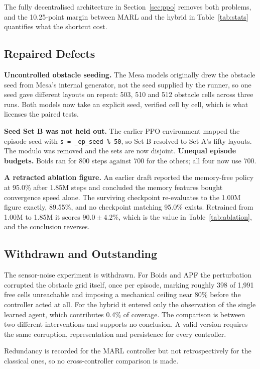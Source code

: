 \documentclass[a4paper, 10pt, conference]{ieeeconf}
\begin{document}
The fully decentralised architecture in Section~\ref{sec:ppo}
removes both problems, and the 10.25-point margin between MARL and the
hybrid in Table~\ref{tab:stats} quantifies what the shortcut cost.

\subsection{Repaired Defects}

\textbf{Uncontrolled obstacle seeding.} The Mesa models originally
drew the obstacle seed from Mesa's internal generator, not the seed
supplied by the runner, so one seed gave different layouts on repeat:
503, 510 and 512 obstacle cells across three runs. Both models now
take an explicit seed, verified cell by cell, which is what licenses
the paired tests.

\textbf{Seed Set B was not held out.} The earlier PPO environment
mapped the episode seed with \texttt{s = \_ep\_seed \% 50}, so Set B
resolved to Set A's fifty layouts. The modulo was removed and the sets
are now disjoint. \textbf{Unequal episode budgets.} Boids ran
for 800 steps against 700 for the others; all four now use 700.

\textbf{A retracted ablation figure.} An earlier draft reported the
memory-free policy at 95.0\% after 1.85M steps and concluded the
memory features bought convergence speed alone. The surviving
checkpoint re-evaluates to the 1.00M figure exactly, 89.55\%, and no
checkpoint matching 95.0\% exists. Retrained from 1.00M to 1.85M it
scores $90.0\pm4.2\%$, which is the value in
Table~\ref{tab:ablation}, and the conclusion reverses.

\subsection{Withdrawn and Outstanding}

The sensor-noise experiment is withdrawn. For Boids and APF the
perturbation corrupted the obstacle grid itself, once per episode,
marking roughly 398 of 1{,}991 free cells unreachable and imposing a
mechanical ceiling near 80\% before the controller acted at all. For
the hybrid it entered only the observation of the single learned
agent, which contributes 0.4\% of coverage. The comparison is between
two different interventions and supports no conclusion. A valid
version requires the same corruption, representation and
persistence for every controller.

Redundancy is recorded for the MARL controller but not
retrospectively for the classical ones, so no cross-controller
comparison is made.
\end{document}
